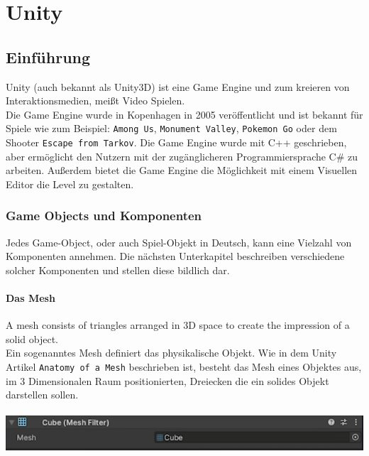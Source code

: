 \pagebreak
{}
\chapter{Unity}

\section{Einführung}
Unity (auch bekannt als Unity3D) ist eine Game Engine und  zum kreieren von Interaktionsmedien, meißt Video Spielen. \Cite[][A history of the unity game engine]{haas2014history} \\

Die Game Engine wurde in Kopenhagen in 2005 veröffentlicht und ist bekannt für Spiele wie zum Beispiel: \verb+Among Us+, \verb+Monument Valley+, \verb+Pokemon Go+ oder dem Shooter \verb+Escape from Tarkov+. Die Game Engine wurde mit C++ geschrieben, aber ermöglicht den Nutzern mit der zugänglicheren Programmiersprache C\# zu arbeiten. Außerdem bietet die Game Engine die Möglichkeit mit einem Visuellen Editor die Level zu gestalten.

\subsection{Game Objects und Komponenten}
Jedes Game-Object, oder auch Spiel-Objekt in Deutsch, kann eine Vielzahl von Komponenten annehmen. Die nächsten Unterkapitel beschreiben verschiedene solcher Komponenten und stellen diese bildlich dar.

\subsubsection{Das Mesh}
\glqq A mesh consists of triangles arranged in 3D space to create the impression of a solid object. \grqq \Cite[][Anatomy of a Mesh, Unity Documentation]{unitydoc}\\
Ein sogenanntes Mesh definiert das physikalische Objekt. Wie in dem Unity Artikel \verb+Anatomy of a Mesh+ beschrieben ist, besteht das Mesh eines Objektes aus, im 3 Dimensionalen Raum positionierten, Dreiecken die ein solides Objekt darstellen sollen.\\\\
\noindent
\includegraphics[width=1\linewidth]{chapters/14/Images/Mesh2.png}

